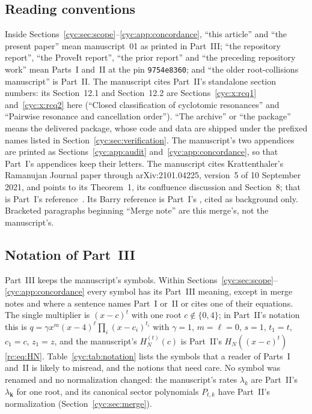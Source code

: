 \documentclass[11pt,a4paper]{article}
\numberwithin{equation}{section}
\theoremstyle{definition}
\theoremstyle{remark}
\newcommand{\bk}{\boldsymbol{k}}
\newcommand{\cH}[2]{H_{#1}^{(#2)}}
\begin{document}
\subsection{Reading conventions}\label{cyc:sec:reading}
Inside Sections~\ref{cyc:sec:scope}--\ref{cyc:app:concordance}, ``this
article'' and ``the present paper'' mean manuscript~01 as printed in
Part~III; ``the repository report'', ``the ProveIt report'', ``the prior
report'' and ``the preceding repository work'' mean Parts~I and~II at the
pin \texttt{9754e8360}; and ``the older root-collisions manuscript'' is
Part~II.  The manuscript cites Part~II's standalone section numbers:
its Section~12.1 and Section~12.2 are Sections~\ref{cyc:x:rcq1}
and~\ref{cyc:x:rcq2} here (``Closed classification of cyclotomic
resonances'' and ``Pairwise resonance and cancellation order'').  ``The
archive'' or ``the package'' means the delivered package, whose code and
data are shipped under the prefixed names listed in
Section~\ref{cyc:sec:verification}.  The manuscript's two appendices are
printed as Sections~\ref{cyc:app:audit} and~\ref{cyc:app:concordance}, so
that Part~I's appendices keep their letters.  The manuscript cites
Krattenthaler's Ramanujan Journal paper through arXiv:2101.04225,
version~5 of 10 September 2021, and points to its Theorem~1, its
confluence discussion and Section~8; that is Part~I's
reference~\cite{Krattenthaler2023}.  Its Barry reference is Part~I's
\cite{Barry2020}, cited as background only.  Bracketed paragraphs
beginning ``Merge note'' are this merge's, not the manuscript's.

\subsection{Notation of Part~III}\label{cyc:sec:notation}
Part~III keeps the manuscript's symbols.  Within
Sections~\ref{cyc:sec:scope}--\ref{cyc:app:concordance} every symbol has
its Part~III meaning, except in merge notes and where a sentence names
Part~I or~II or cites one of their equations.  The single multiplier is
$(x-c)^t$ with one root $c\notin\{0,4\}$; in Part~II's notation this is
$q=\gamma x^m(x-4)^\ell\prod_i(x-c_i)^{t_i}$ with $\gamma=1$, $m=\ell=0$,
$s=1$, $t_1=t$, $c_1=c$, $z_1=z$, and the manuscript's
$\cH Nt(c)$ is Part~II's $H_N((x-c)^t)$ \eqref{rc:eq:HN}.
Table~\ref{cyc:tab:notation} lists the symbols that a reader of Parts~I
and~II is likely to misread, and the notions that need care.  No
symbol was renamed and no normalization changed: the manuscript's rates
$\lambda_k$ are Part~II's $\lambda_{\bk}$ for one root, and its canonical
sector polynomials $P_{t,k}$ have Part~II's normalization
(Section~\ref{cyc:sec:merge}).
\end{document}
